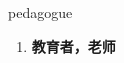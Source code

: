 
\begin{frame}
{\huge pedagogue}
\begin{center}
\begin{enumerate}\Large
  \item \textbf{教育者，老师}
\end{enumerate}
\end{center}
\end{frame}
